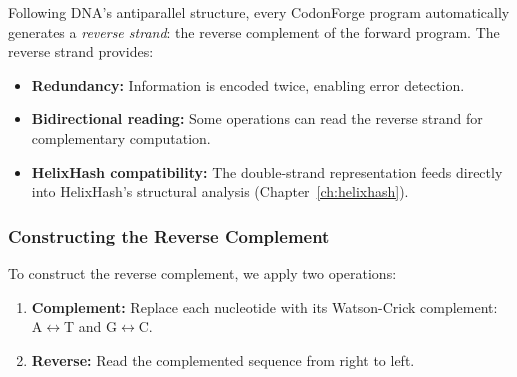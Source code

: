 Following DNA's antiparallel structure, every CodonForge program automatically generates a \emph{reverse strand}: the reverse complement of the forward program. The reverse strand provides:

\begin{itemize}[leftmargin=1.8em]
  \item \textbf{Redundancy:} Information is encoded twice, enabling error detection.
  \item \textbf{Bidirectional reading:} Some operations can read the reverse strand for complementary computation.
  \item \textbf{HelixHash compatibility:} The double-strand representation feeds directly into HelixHash's structural analysis (Chapter~\ref{ch:helixhash}).
\end{itemize}

\subsubsection{Constructing the Reverse Complement}

To construct the reverse complement, we apply two operations:
\begin{enumerate}[leftmargin=1.8em]
  \item \textbf{Complement:} Replace each nucleotide with its Watson-Crick complement: A$\leftrightarrow$T and G$\leftrightarrow$C.
  \item \textbf{Reverse:} Read the complemented sequence from right to left.
\end{enumerate}

